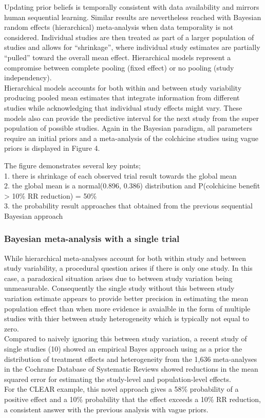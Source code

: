 \documentclass[
  letterpaper,
  DIV=11,
  numbers=noendperiod]{scrartcl}
\begin{document}
Updating prior beliefs is temporally consistent with data availability
and mirrors human sequential learning. Similar results are nevertheless
reached with Bayesian random effects (hierarchical) meta-analysis when
data temporality is not considered. Individual studies are then treated
as part of a larger population of studies and allows for ``shrinkage'',
where individual study estimates are partially ``pulled'' toward the
overall mean effect. Hierarchical models represent a compromise between
complete pooling (fixed effect) or no pooling (study independency).\\
Hierarchical models accounts for both within and between study
variability producing pooled mean estimates that integrate information
from different studies while acknowledging that individual study effects
might vary. These models also can provide the predictive interval for
the next study from the super population of possible studies. Again in
the Bayesian paradigm, all parameters require an initial priors and a
meta-analysis of the colchicine studies using vague priors is displayed
in Figure 4.

The figure demonstrates several key points;\\
1. there is shrinkage of each observed trial result towards the global
mean\\
2. the global mean is a normal(0.896, 0.386) distribution and
P(colchicine benefit \textgreater{} 10\% RR reduction) = 50\%\\
3. the probability result approaches that obtained from the previous
sequential Bayesian approach

\subsubsection{Bayesian meta-analysis with a single
trial}\label{bayesian-meta-analysis-with-a-single-trial}

While hierarchical meta-analyses account for both within study and
between study variability, a procedural question arises if there is only
one study. In this case, a paradoxical situation arises due to between
study variation being unmeasurable. Consequently the single study
without this between study variation estimate appears to provide better
precision in estimating the mean population effect than when more
evidence is avaialble in the form of multiple studies with thier between
study heterogeneity which is typically not equal to zero.\\
Compared to naively ignoring this between study variation, a recent
study of single studies (10) showed an empirical Bayes approach using as
a prior the distribution of treatment effects and heterogeneity from the
1,636 meta-analyses in the Cochrane Database of Systematic Reviews
showed reductions in the mean squared error for estimating the
study-level and population-level effects.\\
For the CLEAR example, this novel approach gives a 58\% probability of a
positive effect and a 10\% probability that the effect exceeds a 10\% RR
reduction, a consistent answer with the previous analysis with vague
priors.
\end{document}
